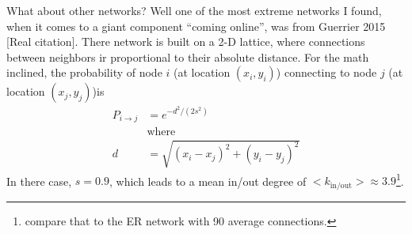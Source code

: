 \documentclass{article}
\begin{document}
What about other networks? Well one of the most extreme networks I found, when it comes to a giant component ``coming online'', was from Guerrier 2015 [Real citation]. There network is built on a 2-D lattice, where connections between neighbors ir proportional to their absolute distance. For the math inclined, the probability of node $i$ (at location $(x_i,y_i)$) connecting to node $j$ (at location $(x_j,y_j)$)is
\begin{align}
P_{i\rightarrow j}&=e^{-d^2/(2s^2)} \\
&\text{where} \nonumber \\
d &= \sqrt{(x_i-x_j)^2+(y_i-y_j)^2} \nonumber
\end{align}
In there case, $s=0.9$, which leads to a mean in/out degree of $<k_\text{in/out}> \approx 3.9$\footnote{compare that to the ER network with 90 average connections.}.
\end{document}
